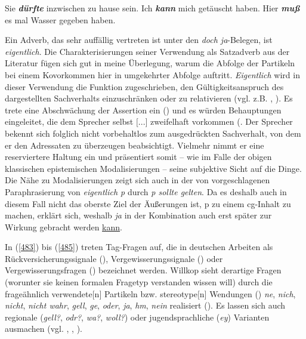 \begin{exe}
	\ex\label{493} 
		\begin{xlist}	
			\ex\label{493a} Sie \textit{\textbf{dürfte}} inzwischen zu hause sein.
			\hfill\hbox {\citet[29]{Diewald1997}}
			\ex\label{493b} Ich \textit{\textbf{kann}} mich getäuscht haben.	
			\hfill\hbox {\citet[278]{Diewald1999b}}
			\ex\label{493c} Hier \textit{\textbf{muß}} es mal Wasser gegeben haben.
			\hfill\hbox {\citet[67]{Dietrich1992}}			
		\end{xlist}
\end{exe}
Ein Adverb, das sehr auffällig vertreten ist unter den \textit{doch ja}-Belegen, ist \textit{eigentlich}. Die Charakterisierungen seiner Verwendung als Satzadverb  aus der Literatur fügen sich gut in meine Überlegung, warum die Abfolge der Partikeln bei einem Kovorkommen hier in umgekehrter Abfolge auftritt. \textit{Eigentlich} wird in dieser Verwendung die Funktion zugeschrieben, den Gültigkeitsanspruch des dargestellten Sachverhalts einzuschränken oder zu relativieren (vgl. z.B. \citealt[26]{Albrecht1977}, \citealt[77]{Koenig1990}). Es trete eine \glqq Abschwächung der Assertion\grqq{} ein (\citealt[26]{Albrecht1977}) und es würden Behauptungen eingeleitet, \glqq die dem Sprecher selbst $[$...$]$ zweifelhaft vorkommen\grqq{} (\citealt[340]{Reiners1943}. Der Sprecher bekennt sich folglich nicht vorbehaltlos zum ausgedrückten Sachverhalt, von dem er den Adressaten zu überzeugen beabsichtigt. Vielmehr nimmt er eine reserviertere Haltung ein und präsentiert somit – wie im Falle der obigen klassischen epistemischen Modalisierungen – seine subjektive  Sicht auf die Dinge. Die Nähe zu Modalisierungen zeigt sich auch in der von \citet[26]{Albrecht1977} vorgeschlagenen Paraphrasierung von \textit{eigentlich p} durch \textit{p sollte gelten}. Da es deshalb auch in diesem Fall nicht das oberste Ziel der Äußerungen ist, p zu einem cg-Inhalt zu machen, erklärt sich, weshalb \textit{ja} in der Kombination auch erst später zur Wirkung gebracht werden \underline{kann}.
 
In (\ref{483}) bis (\ref{485}) treten Tag-Fragen  auf, die in deutschen Arbeiten als \glqq Rückversicherungssignale\grqq{} (\citealt{Schwitalla2002}), \glqq Vergewisserungssignale\grqq{} (\citealt{Weinrich2005[1993]}) oder \glqq Vergewisserungsfragen\grqq{} (\citealt{Willkop1988}) bezeichnet werden. Willkop sieht derartige \glq Fragen\grq {} (worunter sie keinen formalen Fragetyp verstanden wissen will) durch die \glqq frageähnlich verwendete$[$n$]$ Partikeln\grqq{} bzw. \glqq ste\-reotype$[$n$]$ Wendungen\grqq{} (\citeyear[70]{Willkop1988}) \textit{ne}, \textit{nich}, \textit{nicht}, \textit{nicht wahr}, \textit{gell}, \textit{ge}, \textit{oder}, \textit{ja}, \textit{hm}, \textit{nein} realisiert (\citeyear[71]{Willkop1988}). Es lassen sich auch regionale (\textit{gell?}, \textit{odr?}, \textit{wa?}, \textit{woll?}) oder jugendsprachliche (\textit{ey}) Varianten ausmachen (vgl. \citealt[265]{Schwitalla2002}, \citealt[128]{Imo2011}, \citealt{Frey2010}).
 
